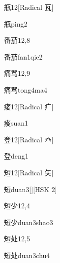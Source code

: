 \begin{entry}{甁}{12}[Radical 瓦]
  \begin{phonetics}{甁}{ping2}
  \end{phonetics}
\end{entry}

\begin{entry}{番茄}{12,8}
  \begin{phonetics}{番茄}{fan1qie2}
  \end{phonetics}
\end{entry}

\begin{entry}{痛骂}{12,9}
  \begin{phonetics}{痛骂}{tong4ma4}
  \end{phonetics}
\end{entry}

\begin{entry}{痠}{12}[Radical 疒]
  \begin{phonetics}{痠}{suan1}
  \end{phonetics}
\end{entry}

\begin{entry}{登}{12}[Radical 癶]
  \begin{phonetics}{登}{deng1}
  \end{phonetics}
\end{entry}

\begin{entry}{短}{12}[Radical ⽮]
  \begin{phonetics}{短}{duan3}[][HSK 2]
  \end{phonetics}
\end{entry}

\begin{entry}{短少}{12,4}
  \begin{phonetics}{短少}{duan3shao3}
  \end{phonetics}
\end{entry}

\begin{entry}{短处}{12,5}
  \begin{phonetics}{短处}{duan3chu4}
  \end{phonetics}
\end{entry}

